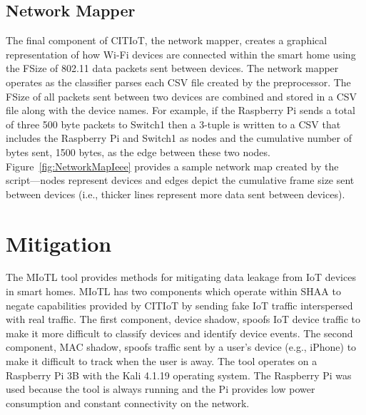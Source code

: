 \documentclass[journal]{./IEEEtran/IEEEtran}
\begin{document}
\figNetworkMapIeee

\subsection{Network Mapper}
The final component of \ac{CITIoT}, the network mapper, creates a graphical representation of how Wi-Fi devices are connected within the smart home using the \ac{FSize} of 802.11 data packets sent between devices. The network mapper operates as the classifier parses each \ac{CSV} file created by the preprocessor. The \ac{FSize} of all packets sent between two devices are combined and stored in a \ac{CSV} file along with the device names. For example, if the Raspberry Pi sends a total of three 500 byte packets to Switch1 then a 3-tuple is written to a \ac{CSV} that includes the Raspberry Pi and Switch1 as nodes and the cumulative number of bytes sent, 1500 bytes, as the edge between these two nodes. Figure~\ref{fig:NetworkMapIeee} provides a sample network map created by the script---nodes represent devices and edges depict the cumulative frame size sent between devices (i.e., thicker lines represent more data sent between devices).

\section{Mitigation} \label{mitigation}

The \ac{MIoTL} tool provides methods for mitigating data leakage from \ac{IoT} devices in smart homes. \ac{MIoTL} has two components which operate within \ac{SHAA} to negate capabilities provided by \ac{CITIoT} by sending fake \ac{IoT} traffic interspersed with real traffic. The first component, device shadow, spoofs \ac{IoT} device traffic to make it more difficult to classify devices and identify device events. The second component, MAC shadow, spoofs traffic sent by a user's device (e.g., iPhone) to make it difficult to track when the user is away. The tool operates on a Raspberry Pi 3B with the Kali 4.1.19 operating system. The Raspberry Pi was used because the tool is always running and the Pi provides low power consumption and constant connectivity on the network.
\end{document}
